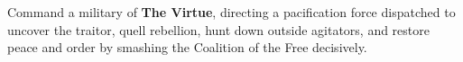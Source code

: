 \begin{center}
\begin{minipage}[c]{4in}
  Command a military of \textbf{The Virtue}, directing a pacification
  force dispatched to uncover the traitor, quell rebellion, hunt down
  outside agitators, and restore peace and order by smashing the
  Coalition of the Free decisively.
\end{minipage}%
\hspace{2em}%
\begin{minipage}[c]{1in}
\end{minipage}
\end{center}
